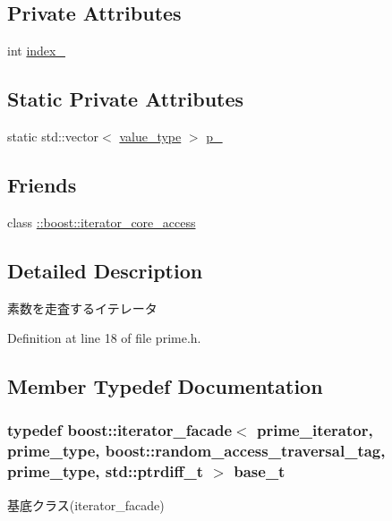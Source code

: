\subsection*{\-Private \-Attributes}
\begin{DoxyCompactItemize}
\item 
int \hyperlink{classyuh_1_1range__detail_1_1prime__iterator_aaaf1ac02dfa554a3cdffc647d512a77b}{index\-\_\-}
\end{DoxyCompactItemize}
\subsection*{\-Static \-Private \-Attributes}
\begin{DoxyCompactItemize}
\item 
static std\-::vector$<$ \hyperlink{classyuh_1_1range__detail_1_1prime__iterator_ab7468d4ed49b58c84d6c1b71779fb43e}{value\-\_\-type} $>$ \hyperlink{classyuh_1_1range__detail_1_1prime__iterator_aff6d0a0fbc14123c0fca5a0c05d2e68c}{p\-\_\-}
\end{DoxyCompactItemize}
\subsection*{\-Friends}
\begin{DoxyCompactItemize}
\item 
class \hyperlink{classyuh_1_1range__detail_1_1prime__iterator_a986bf0deaa7559f361d03122eeea4c86}{\-::boost\-::iterator\-\_\-core\-\_\-access}
\end{DoxyCompactItemize}


\subsection{\-Detailed \-Description}
素数を走査するイテレータ 

\-Definition at line 18 of file prime.\-h.



\subsection{\-Member \-Typedef \-Documentation}
\hypertarget{classyuh_1_1range__detail_1_1prime__iterator_af6bf48039295b29ac1f86bd776f4a29a}{
\subsubsection[{base\-\_\-t}]{\setlength{\rightskip}{0pt plus 5cm}typedef boost\-::iterator\-\_\-facade$<$ {\bf prime\-\_\-iterator}, {\bf prime\-\_\-type}, boost\-::random\-\_\-access\-\_\-traversal\-\_\-tag, {\bf prime\-\_\-type}, std\-::ptrdiff\-\_\-t $>$ {\bf base\-\_\-t}}}\label{d9/dc8/classyuh_1_1range__detail_1_1prime__iterator_af6bf48039295b29ac1f86bd776f4a29a}
基底クラス(iterator\-\_\-facade) 

